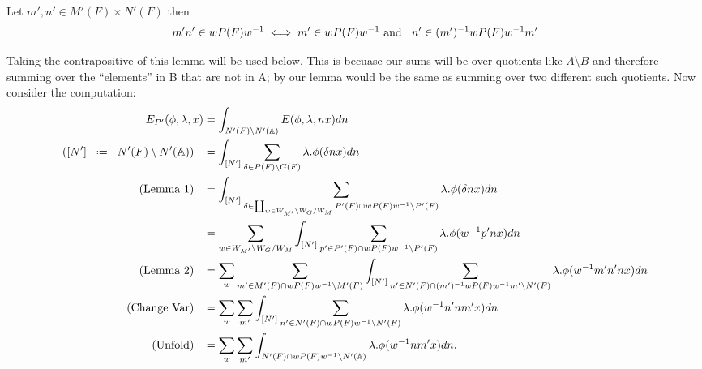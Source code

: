     \begin{Lemma}\label{lem:2}
        Let \(m', n'\in M'(F)\times N'(F)\) then 
        \[m'n' \in wP(F)w^{-1} \iff m'\in wP(F)w^{-1} \text{ and  }\;\; n'\in (m')^{-1} wP(F)w^{-1} m'\]
    \end{Lemma}
    Taking the contrapositive of this lemma will be used below. This is becuase our sums will be over quotients like \(A\setminus B\) and therefore summing over the ``elements'' in B that are not in A; by our lemma would be the same as summing over two different such quotients.
    Now consider the computation:
    \begin{equation*}
        \begin{aligned}
            E_{P'}( \phi, \lambda, x) &= \int_{N'(F)\setminus N'(\A)} E( \phi, \lambda, nx) dn\\
                                    ([N']\defeq N'(F)\setminus N'(\A)) \;\;\; &= \int_{[N']} \sum_{\delta\in P(F)\setminus G(F)} \lambda.\phi(\delta nx)  dn\\
                                    (\text{Lemma 1}) \;\;\; &= \int_{[N']} \sum_{\delta\in \coprod_{w\in W_{M'}\setminus W_G / W_{M}} P'(F)\cap wP(F)w\inv \setminus P'(F)} \lambda.\phi(\delta nx)  dn\\
                                     &= \sum_{ w\in W_{M'}\setminus W_G / W_{M}}\int_{[N']} \sum_{p'\in P'(F)\cap wP(F)w\inv \setminus P'(F)} \lambda.\phi( w\inv p'nx)  dn\\
                                    (\text{Lemma 2}) \;\;\; &= \sum_{ w} \sum_{m'\in M'(F)\cap wP(F)w\inv\setminus M'(F)} \int_{[N']} \sum_{n'\in N'(F)\cap (m')\inv wP(F)w\inv m' \setminus N'(F)} \lambda.\phi( w\inv m'n'nx)  dn\\
                                    (\text{Change Var}) \;\;\; &= \sum_{ w} \sum_{m'} \int_{[N']} \sum_{n'\in N'(F)\cap wP(F)w\inv\setminus N'(F) } \lambda.\phi( w\inv n'nm'x)  dn\\
                                    (\text{Unfold}) \;\;\; &= \sum_{ w} \sum_{m'} \int_{N'(F)\cap wP(F)w\inv \setminus N'(\A)} \lambda.\phi( w\inv nm' x)  dn.\\
        \end{aligned}
    \end{equation*}
